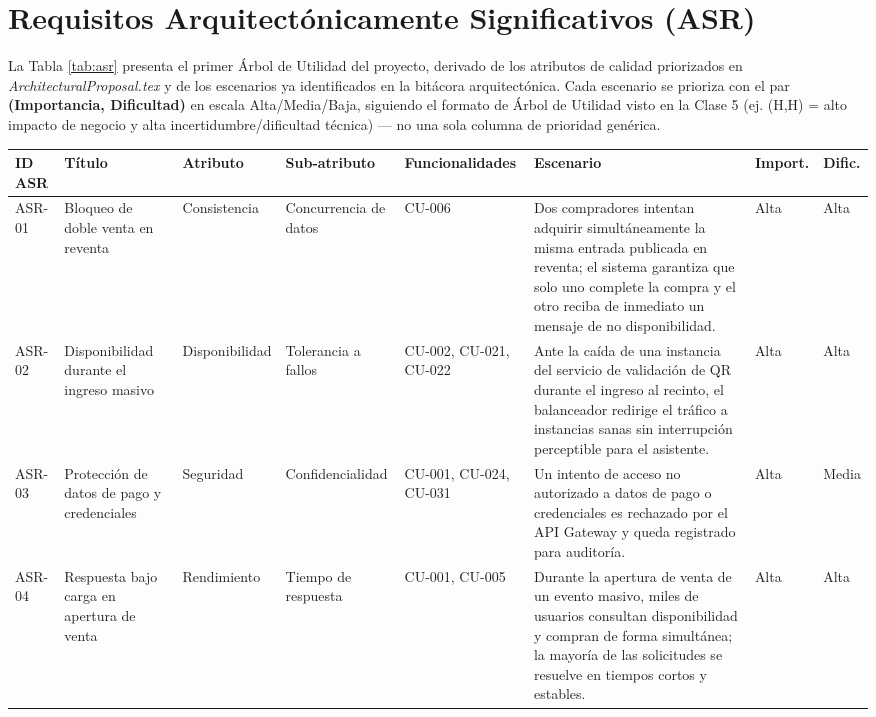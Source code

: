\documentclass[11pt,a4paper]{article}
\begin{document}
\section{Requisitos Arquitectónicamente Significativos (ASR)}
\label{sec:asr}

La Tabla \ref{tab:asr} presenta el primer Árbol de Utilidad del proyecto, derivado de los
atributos de calidad priorizados en \textit{ArchitecturalProposal.tex} y de los escenarios ya
identificados en la bitácora arquitectónica. Cada escenario se prioriza con el par
\textbf{(Importancia, Dificultad)} en escala Alta/Media/Baja, siguiendo el formato de Árbol de
Utilidad visto en la Clase 5 (ej. (H,H) = alto impacto de negocio y alta incertidumbre/dificultad
técnica) — no una sola columna de prioridad genérica.

\begin{center}
\begin{longtable}{|p{1.1cm}|p{2cm}|p{1.8cm}|p{1.7cm}|p{1.8cm}|p{3.6cm}|p{1.1cm}|p{1.1cm}|}
\hline
\textbf{ID ASR} & \textbf{Título} & \textbf{Atributo} & \textbf{Sub-atributo} &
\textbf{Funcionalidades} & \textbf{Escenario} & \textbf{Import.} & \textbf{Dific.}\\
\hline
\endhead
ASR-01 & Bloqueo de doble venta en reventa & Consistencia & Concurrencia de datos & CU-006 & Dos
compradores intentan adquirir simultáneamente la misma entrada publicada en reventa; el sistema
garantiza que solo uno complete la compra y el otro reciba de inmediato un mensaje de no
disponibilidad. & Alta & Alta\\
\hline
ASR-02 & Disponibilidad durante el ingreso masivo & Disponibilidad & Tolerancia a fallos &
CU-002, CU-021, CU-022 & Ante la caída de una instancia del servicio de validación de QR durante
el ingreso al recinto, el balanceador redirige el tráfico a instancias sanas sin interrupción
perceptible para el asistente. & Alta & Alta\\
\hline
ASR-03 & Protección de datos de pago y credenciales & Seguridad & Confidencialidad & CU-001,
CU-024, CU-031 & Un intento de acceso no autorizado a datos de pago o credenciales es rechazado
por el API Gateway y queda registrado para auditoría. & Alta & Media\\
\hline
ASR-04 & Respuesta bajo carga en apertura de venta & Rendimiento & Tiempo de respuesta & CU-001,
CU-005 & Durante la apertura de venta de un evento masivo, miles de usuarios consultan
disponibilidad y compran de forma simultánea; la mayoría de las solicitudes se resuelve en
tiempos cortos y estables. & Alta & Alta\\

\end{longtable}
\end{center}
\end{document}
